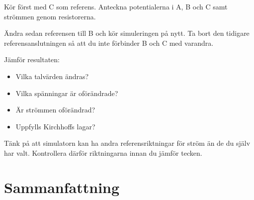 \documentclass[
  swedish,
  11pt,
  a4paper,
  DIV=11,
  numbers=noendperiod,
  twoside,
  open=any]{scrreprt}
\begin{document}
Kör först med C som referens. Anteckna potentialerna i A, B och C samt
strömmen genom resistorerna.

Ändra sedan referensen till B och kör simuleringen på nytt. Ta bort den
tidigare referensanslutningen så att du inte förbinder B och C med
varandra.

Jämför resultaten:

\begin{itemize}
\item
  Vilka talvärden ändras?
\item
  Vilka spänningar är oförändrade?
\item
  Är strömmen oförändrad?
\item
  Uppfylls Kirchhoffs lagar?
\end{itemize}

Tänk på att simulatorn kan ha andra referensriktningar för ström än de
du själv har valt. Kontrollera därför riktningarna innan du jämför
tecken.

\section{Sammanfattning}\label{sec-grunder-sammanfattning}
\end{document}

